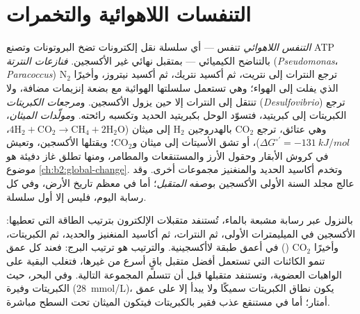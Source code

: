 \section{التنفسات اللاهوائية والتخمرات}

\begin{definition}\label{def:b2:microbial-metabolism:anaerobic}
\emph{التنفس اللاهوائي} تنفس --- أي سلسلة نقل إلكترونات تضخ
البروتونات وتصنع ATP بالتناضح الكيميائي --- بمتقبل نهائي غير
الأكسجين. \emph{فنازعات النترتة} (\emph{Pseudomonas}،
\emph{Paracoccus}) ترجع النترات إلى نتريت، ثم أكسيد نتريك، ثم أكسيد
نيتروز، وأخيرًا $\mathrm{N_2}$ الذي يفلت إلى الهواء؛ وهي تستعمل
سلسلتها الهوائية مع بضعة إنزيمات مضافة، ولا تنتقل إلى النترات إلا
حين يزول الأكسجين. و\emph{مرجعات الكبريتات}
(\emph{Desulfovibrio}) ترجع الكبريتات إلى كبريتيد، فتسوّد الوحل
بكبريتيد الحديد وتكسبه رائحته. و\emph{مولّدات الميثان}، وهي عتائق،
ترجع $\mathrm{CO_2}$ بالهدروجين $\mathrm{H_2}$ إلى ميثان
($4\mathrm{H_2} + \mathrm{CO_2} \to \mathrm{CH_4} +
2\mathrm{H_2O}$، $\Delta G^{\circ\prime} = \qty{-131}{kJ/mol}$)، أو
تشق الأسيتات إلى ميثان و$\mathrm{CO_2}$؛ ويقتلها الأكسجين، وتعيش في
كروش الأبقار وحقول الأرز والمستنقعات والمطامر، ومنها تطلق غاز
دفيئة هو موضوع \cref{ch:b2:global-change}. وتخدم أكاسيد الحديد
والمنغنيز مجموعات أخرى. وقد عالج مجلد السنة الأولى الأكسجين بوصفه
\emph{المتقبل}؛ أما في معظم تاريخ الأرض، وفي كل رسابة اليوم، فليس
إلا أول سلسلة.
\end{definition}

\begin{proposition}\label{prop:b2:microbial-metabolism:sequence}
بالنزول عبر رسابة مشبعة بالماء، تُستنفد متقبلات الإلكترون بترتيب
الطاقة التي تعطيها: الأكسجين في الميليمترات الأولى، ثم النترات، ثم
أكاسيد المنغنيز والحديد، ثم الكبريتات، وأخيرًا $\mathrm{CO_2}$
() في أعمق طبقة لاأكسجينية. والترتيب هو ترتيب البرج:
فعند كل عمق تنمو الكائنات التي تستعمل أفضل متقبل باقٍ أسرع من
غيرها، فتغلب البقية على الواهبات العضوية، وتستنفد متقبلها قبل أن
تتسلم المجموعة التالية. وفي البحر، حيث الكبريتات وفيرة
(\qty{28}{mmol/L})، يكون نطاق الكبريتات سميكًا ولا يبدأ  إلا على عمق أمتار؛ أما في مستنقع عذب فقير بالكبريتات فيتكون
الميثان تحت السطح مباشرة.
\end{proposition}

